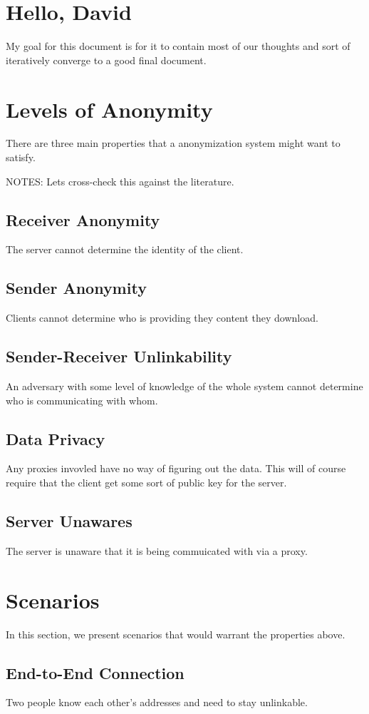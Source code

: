 \documentclass{article}
\begin{document}
\section{Hello, David}
My goal for this document is for it to contain most of our thoughts and sort of iteratively converge to a good final document.

\section{Levels of Anonymity}
There are three main properties that a anonymization system might want to satisfy.

NOTES: Lets cross-check this against the literature.
\subsection{Receiver Anonymity}
The server cannot determine the identity of the client.
\subsection{Sender Anonymity}
Clients cannot determine who is providing they content they download.
\subsection{Sender-Receiver Unlinkability}
An adversary with some level of knowledge of the whole system cannot determine who is communicating with whom.
\subsection{Data Privacy}
Any proxies invovled have no way of figuring out the data.  This will of course require that the client get some sort of public key for the server.
\subsection{Server Unawares}
The server is unaware that it is being commuicated with via a proxy.
\section{Scenarios}
In this section, we present scenarios that would warrant the properties above.
\subsection{End-to-End Connection}
Two people know each other's addresses and need to stay unlinkable.
\end{document}
